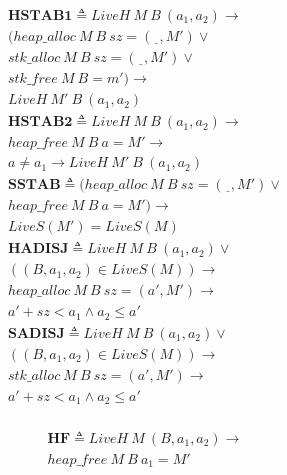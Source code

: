 \documentclass{article}
\begin{document}
\begin{figure}
  \begin{minipage}{0.5\textwidth}
    \[\begin{aligned}
    \mathbf{HSTAB1} \triangleq \mathit{LiveH} ~ M ~ B ~ (a_1,a_2) \rightarrow & \\
    (\mathit{heap\_alloc} ~ M ~ B ~ sz = (\underline{~~}, M') \lor & \\
    \mathit{stk\_alloc} ~ M ~ B ~ sz = (\underline{~~}, M') \lor & \\
    \mathit{stk\_free} ~ M ~ B = m') \rightarrow & \\
    \mathit{LiveH} ~ M' ~ B ~ (a_1,a_2) & \\[0.75em]
    \mathbf{HSTAB2} \triangleq \mathit{LiveH} ~ M ~ B ~ (a_1,a_2) \rightarrow & \\
    \mathit{heap\_free} ~ M ~ B ~ a = M' \rightarrow & \\
    a \not = a_1 \rightarrow \mathit{LiveH} ~ M' ~ B ~ (a_1,a_2) & \\[0.75em]
    \mathbf{SSTAB} \triangleq
    (\mathit{heap\_alloc} ~ M ~ B ~ sz = (\underline{~~}, M') \lor & \\
    \mathit{heap\_free} ~ M ~ B ~ a = M') \rightarrow & \\
    \mathit{LiveS}(M') = \mathit{LiveS}(M) & \\[0.75em]
    \mathbf{HADISJ} \triangleq \mathit{LiveH} ~ M ~ B ~ (a_1,a_2) \lor & \\
    ((B,a_1,a_2) \in \mathit{LiveS}(M)) \rightarrow & \\
    \mathit{heap\_alloc} ~ M ~ B ~ sz = (a', M') \rightarrow & \\
    a'+sz < a_1 \land a_2 \leq a' & \\[0.75em]
    \mathbf{SADISJ} \triangleq \mathit{LiveH} ~ M ~ B ~ (a_1,a_2) \lor & \\
    ((B,a_1,a_2) \in \mathit{LiveS}(M)) \rightarrow & \\
    \mathit{stk\_alloc} ~ M ~ B ~ sz = (a', M') \rightarrow & \\
    a'+sz < a_1 \land a_2 \leq a' & \\[0.75em]
    \end{aligned}\]
  \end{minipage}
  \begin{minipage}{0.5\textwidth}
    \[\begin{aligned}
    \mathbf{HF} \triangleq \mathit{LiveH} ~ M ~ (B,a_1,a_2) \rightarrow & \\
    \mathit{heap\_free} ~ M ~ B ~ a_1 = M' & \\[0.75em]

\end{aligned}\]
\end{minipage}
\end{figure}
\end{document}
